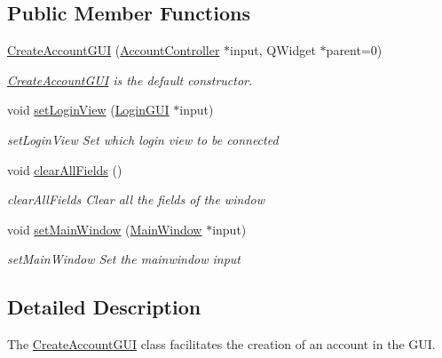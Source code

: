 \subsection*{Public Member Functions}
\begin{DoxyCompactItemize}
\item 
\hyperlink{classCreateAccountGUI_ace0146342dcc201b79e62b041d30bfdb}{Create\+Account\+G\+UI} (\hyperlink{classAccountController}{Account\+Controller} $\ast$input, Q\+Widget $\ast$parent=0)
\begin{DoxyCompactList}\small\item\em \hyperlink{classCreateAccountGUI}{Create\+Account\+G\+UI} is the default constructor. \end{DoxyCompactList}\item 
void \hyperlink{classCreateAccountGUI_a87593f6b85a9c43f21adb5dedd8c7a8e}{set\+Login\+View} (\hyperlink{classLoginGUI}{Login\+G\+UI} $\ast$input)
\begin{DoxyCompactList}\small\item\em set\+Login\+View Set which login view to be connected \end{DoxyCompactList}\item 
void \hyperlink{classCreateAccountGUI_a2171ad97bba8c970f9b374adb7813fb8}{clear\+All\+Fields} ()\hypertarget{classCreateAccountGUI_a2171ad97bba8c970f9b374adb7813fb8}{}\label{classCreateAccountGUI_a2171ad97bba8c970f9b374adb7813fb8}

\begin{DoxyCompactList}\small\item\em clear\+All\+Fields Clear all the fields of the window \end{DoxyCompactList}\item 
void \hyperlink{classCreateAccountGUI_ac53cc6fc986bcb4913bd861108db21b7}{set\+Main\+Window} (\hyperlink{classMainWindow}{Main\+Window} $\ast$input)
\begin{DoxyCompactList}\small\item\em set\+Main\+Window Set the mainwindow input \end{DoxyCompactList}\end{DoxyCompactItemize}


\subsection{Detailed Description}
The \hyperlink{classCreateAccountGUI}{Create\+Account\+G\+UI} class facilitates the creation of an account in the G\+UI. 

